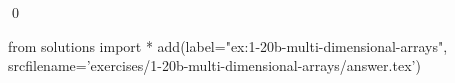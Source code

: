 
\begin{ex} 
  \label{ex:1-20b-multi-dimensional-arrays}
  
  \qed
\end{ex} 
\begin{python0}
from solutions import *
add(label="ex:1-20b-multi-dimensional-arrays",
    srcfilename='exercises/1-20b-multi-dimensional-arrays/answer.tex') 
\end{python0}
